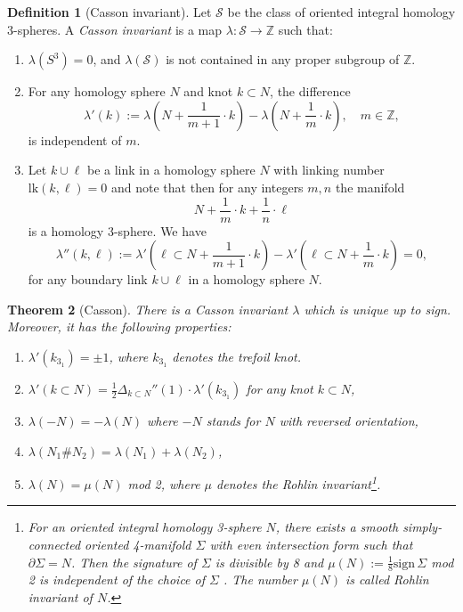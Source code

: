 \documentclass[11pt,colorinlistoftodos]{amsart}
\numberwithin{equation}{subsection}
\theoremstyle{plain}
\newtheorem{thm}{Theorem}[subsection]
\theoremstyle{definition}
\newtheorem{defn}[thm]{Definition}
\theoremstyle{remark}
\newcommand{\Z}{\mathbb{Z}}
\newcommand{\de}{\partial}
\begin{document}
\begin{defn}[Casson invariant\cite{Saveliev1999}]
\label{defn:Casson_invariant}
Let $\mathscr{S}$ be the class of oriented integral homology $3$-spheres. A \emph{Casson invariant} is a map $\lambda\colon \mathscr{S}\to \Z$ such that:
\begin{enumerate}
    \item $\lambda(S^3)=0$, and $\lambda(\mathscr{S})$ is not contained in any proper subgroup of $\Z$.
    \item For any homology sphere $N$ and knot $k\subset N$, the difference
    \begin{equation}
    \lambda'(k):=\lambda\left(N+\frac{1}{m+1}\cdot k\right)-\lambda\left(N+\frac{1}{m}\cdot k\right),\quad m\in\Z,
    \end{equation}
    is independent of $m$.
    \item Let $k\cup \ell$ be a link in a homology sphere $N$ with linking number $\mathrm{lk}(k,\ell)=0$ and note that then for any integers $m,n$ the manifold 
    \[
    N+\frac{1}{m}\cdot k+\frac{1}{n}\cdot \ell
    \]
    is a homology 3-sphere. We have 
    \begin{equation}
    \lambda''(k,\ell):=\lambda'\left(\ell\subset N+\frac{1}{m+1}\cdot k\right)-\lambda'\left(\ell\subset N+\frac{1}{m}\cdot k\right)=0,
    \end{equation}
    for any boundary link $k\cup \ell$ in a homology sphere $N$.
\end{enumerate}
\end{defn}


\begin{thm}[Casson]
\label{thm:Casson}
There is a Casson invariant $\lambda$ which is unique up to sign. Moreover, it has the following properties:
\begin{enumerate}[$(i)$]
    \item $\lambda'(k_{3_1})=\pm 1$, where $k_{3_1}$ denotes the trefoil knot.
    \item $\lambda'(k\subset N)=\frac{1}{2}\Delta_{k\subset N}''(1)\cdot \lambda'(k_{3_1})$ for any knot $k\subset N$,
    \item $\lambda(-N)=-\lambda(N)$ where $-N$ stands for $N$ with reversed orientation,
    \item $\lambda(N_1\#N_2)=\lambda(N_1)+\lambda(N_2)$,
    \item $\lambda(N)=\mu(N)$ mod 2, where $\mu$ denotes the \emph{Rohlin invariant}\footnote{For an oriented integral homology 3-sphere $N$, there exists a smooth simply-connected oriented 4-manifold $\Sigma$ with even intersection form such that $\de\Sigma=N$. Then the signature of $\Sigma$ is divisible by 8 and $\mu(N):=\frac{1}{8}\mathrm{sign}\,\Sigma$ mod 2 is independent of the choice of $\Sigma$ \cite{Saveliev1999}. The number $\mu(N)$ is called \emph{Rohlin invariant} of $N$.}.
\end{enumerate}
\end{thm}
\end{document}

